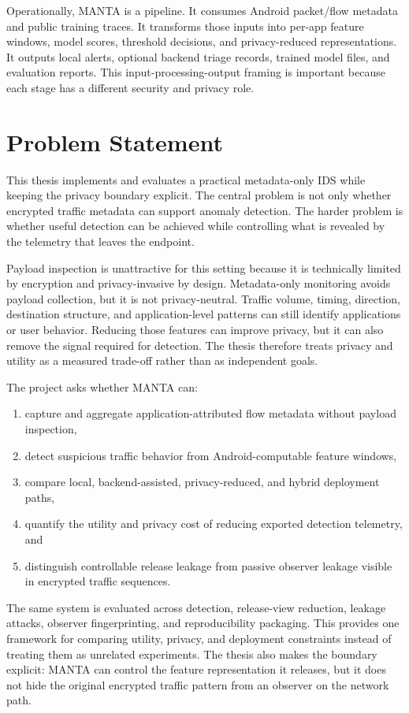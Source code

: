 Operationally, MANTA is a pipeline. It consumes Android packet/flow metadata and public training
traces. It transforms those inputs into per-app feature windows, model scores, threshold decisions,
and privacy-reduced representations. It outputs local alerts, optional backend triage records,
trained model files, and evaluation reports. This input-processing-output framing is important
because each stage has a different security and privacy role.

\section{Problem Statement}
This thesis implements and evaluates a practical metadata-only IDS while keeping the privacy
boundary explicit. The central problem is not only whether encrypted traffic metadata can support
anomaly detection. The harder problem is whether useful detection can be achieved while controlling
what is revealed by the telemetry that leaves the endpoint.

Payload inspection is unattractive for this setting because it is technically limited by encryption
and privacy-invasive by design. Metadata-only monitoring avoids payload collection, but it is not
privacy-neutral. Traffic volume, timing, direction, destination structure, and application-level
patterns can still identify applications or user behavior. Reducing those features can improve
privacy, but it can also remove the signal required for detection. The thesis therefore treats
privacy and utility as a measured trade-off rather than as independent goals.

The project asks whether MANTA can:
\begin{enumerate}[leftmargin=*]
  \item capture and aggregate application-attributed flow metadata without payload inspection,
  \item detect suspicious traffic behavior from Android-computable feature windows,
  \item compare local, backend-assisted, privacy-reduced, and hybrid deployment paths,
  \item quantify the utility and privacy cost of reducing exported detection telemetry, and
  \item distinguish controllable release leakage from passive observer leakage visible in encrypted
  traffic sequences.
\end{enumerate}

The same system is evaluated across detection, release-view reduction, leakage attacks, observer
fingerprinting, and reproducibility packaging. This provides one framework for comparing utility,
privacy, and deployment constraints instead of treating them as unrelated experiments. The thesis
also makes the boundary explicit: MANTA can control the feature representation it releases, but it
does not hide the original encrypted traffic pattern from an observer on the network path.

